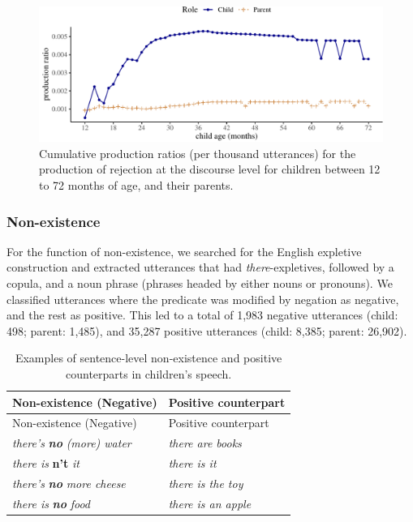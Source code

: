 \documentclass[
  man,floatsintext]{apa6}
\begin{document}
\begin{figure}[H]

{\centering \includegraphics{neg_construction_article_files/figure-latex/emotiondiscourse-1} 

}

\caption{Cumulative production ratios (per thousand utterances) for the production of rejection at the discourse level for children between 12 to 72 months of age, and their parents.}\label{fig:emotiondiscourse}
\end{figure}

\hypertarget{non-existence}{%
\subsubsection{Non-existence}\label{non-existence}}

For the function of non-existence, we searched for the English expletive construction and extracted utterances that had \emph{there}-expletives, followed by a copula, and a noun phrase (phrases headed by either nouns or pronouns). We classified utterances where the predicate was modified by negation as negative, and the rest as positive. This led to a total of 1,983 negative utterances (child: 498; parent: 1,485), and 35,287 positive utterances (child: 8,385; parent: 26,902).

\begin{longtable}[]{@{}ll@{}}
\caption{\label{tab:nonexist} Examples of sentence-level non-existence and positive counterparts in children's speech.}\tabularnewline
\toprule\noalign{}
Non-existence (Negative) & Positive counterpart \\
\midrule\noalign{}
\endfirsthead
\toprule\noalign{}
Non-existence (Negative) & Positive counterpart \\
\midrule\noalign{}
\endhead
\bottomrule\noalign{}
\endlastfoot
\emph{there's} \textbf{\emph{no}} \emph{(more) water} & \emph{there are books} \\
\emph{there is} \textbf{n't} \emph{it} & \emph{there is it} \\
\emph{there's} \textbf{\emph{no}} \emph{more cheese} & \emph{there is the toy} \\
\emph{there is} \textbf{\emph{no}} \emph{food} & \emph{there is an apple} \\
\end{longtable}
\end{document}
